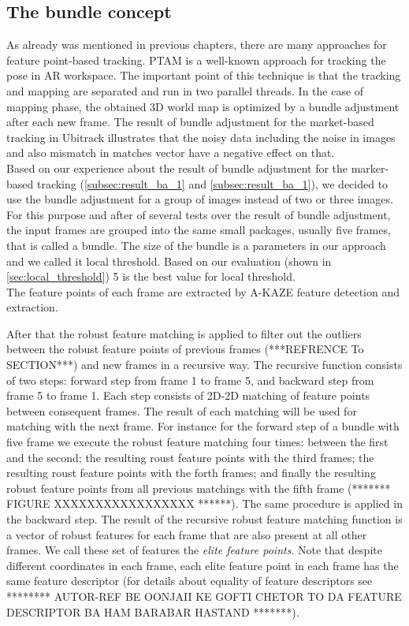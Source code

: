 \subsection{The bundle concept}
As already was mentioned in previous chapters, there are many approaches for feature point-based tracking. PTAM \cite{klein2007parallel} is a well-known approach for tracking the pose in AR workspace. The important point of this technique is that the tracking and mapping are separated and run in two parallel threads. In the case of mapping phase, the obtained 3D world map is optimized by a bundle adjustment after each new frame. The result of bundle adjustment for the market-based tracking in Ubitrack illustrates that the noisy data including the noise in images and also mismatch in matches vector have a negative effect on that.\\
Based on our experience about the result of bundle adjustment for the marker-based tracking (\autoref{subsec:result_ba_1} and \autoref{subsec:result_ba_1}), we decided to use the bundle adjustment for a group of images instead of two or three images. For this purpose and after of several tests over the result of bundle adjustment, the input frames are grouped into the same small packages, usually five frames, that is called a bundle. The size of the bundle is a parameters in our approach and we called it local threshold. Based on our evaluation (shown in \autoref{sec:local_threshold}) 5 is the best value for local threshold.\\
The feature points of each frame are extracted by A-KAZE feature detection and extraction. 



After that the robust feature matching is applied to filter out the outliers between the robust feature points of previous frames (***REFRENCE To SECTION***) and new frames in a recursive way. 
The recursive function consists of two steps: forward step from frame 1 to frame 5, and backward step from frame 5 to frame 1. Each step consists of 2D-2D matching of feature points between consequent frames. The result of each matching will be used for matching with the next frame. For instance for the forward step of a bundle with five frame we execute the robust feature matching four times: between the first and the second; the resulting roust feature points with the third frames; the resulting roust feature points with the forth frames; and finally the resulting robust feature points from all previous matchings with the fifth frame (******* FIGURE XXXXXXXXXXXXXXXXX ******). The same procedure is applied in the backward step. 
The result of the recursive robust feature matching function is a vector of robust features for each frame that are also present at all other frames. We call these set of features the \textit{elite feature points}. Note that despite different coordinates in each frame, each elite feature point in each frame has the same feature descriptor (for details about equality of feature descriptors see ******** AUTOR-REF BE OONJAII KE GOFTI CHETOR TO DA FEATURE DESCRIPTOR BA HAM BARABAR HASTAND *******). 

